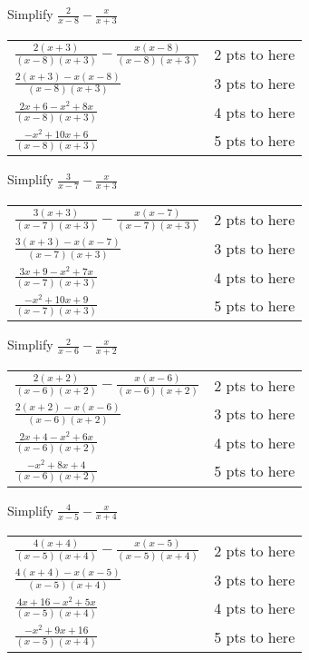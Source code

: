 {
	Simplify $\displaystyle \frac{2}{x-8}-\frac{x}{x+3}$
}
{
	\begin{tabular}{l r}
	$\frac{2(x+3)}{(x-8)(x+3)} - \frac{x(x-8)}{(x-8)(x+3)}$ & 2 pts to here\\
	$\frac{2(x+3)-x(x-8)}{(x-8)(x+3)}$ & 3 pts to here\\
	$\frac{2x+6-x^2+8x}{(x-8)(x+3)}$ & 4 pts to here\\
	$\frac{-x^2+10x+6}{(x-8)(x+3)}$ & 5 pts to here\\
	\end{tabular}
}

{
	Simplify $\displaystyle \frac{3}{x-7}-\frac{x}{x+3}$
}
{
	\begin{tabular}{l r}
	$\frac{3(x+3)}{(x-7)(x+3)} - \frac{x(x-7)}{(x-7)(x+3)}$ & 2 pts to here\\
	$\frac{3(x+3)-x(x-7)}{(x-7)(x+3)}$ & 3 pts to here\\
	$\frac{3x+9-x^2+7x}{(x-7)(x+3)}$ & 4 pts to here\\
	$\frac{-x^2+10x+9}{(x-7)(x+3)}$ & 5 pts to here\\
	\end{tabular}
}

{
	Simplify $\displaystyle \frac{2}{x-6}-\frac{x}{x+2}$
}
{
	\begin{tabular}{l r}
	$\frac{2(x+2)}{(x-6)(x+2)} - \frac{x(x-6)}{(x-6)(x+2)}$ & 2 pts to here\\
	$\frac{2(x+2)-x(x-6)}{(x-6)(x+2)}$ & 3 pts to here\\
	$\frac{2x+4-x^2+6x}{(x-6)(x+2)}$ & 4 pts to here\\
	$\frac{-x^2+8x+4}{(x-6)(x+2)}$ & 5 pts to here\\
	\end{tabular}
}

{
	Simplify $\displaystyle \frac{4}{x-5}-\frac{x}{x+4}$
}
{
	\begin{tabular}{l r}
	$\frac{4(x+4)}{(x-5)(x+4)} - \frac{x(x-5)}{(x-5)(x+4)}$ & 2 pts to here\\
	$\frac{4(x+4)-x(x-5)}{(x-5)(x+4)}$ & 3 pts to here\\
	$\frac{4x+16-x^2+5x}{(x-5)(x+4)}$ & 4 pts to here\\
	$\frac{-x^2+9x+16}{(x-5)(x+4)}$ & 5 pts to here\\
	\end{tabular}
}
